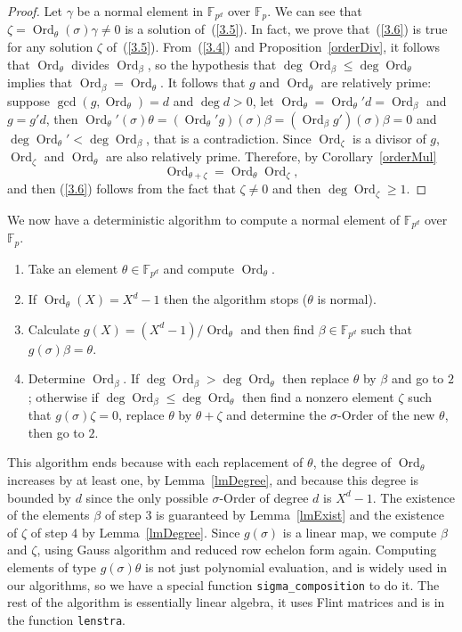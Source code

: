 \documentclass[a4paper,11pt]{article}
\theoremstyle{break}
\theoremstyle{sc}
\theoremstyle{definition}
\theoremstyle{remark}
\DeclareMathOperator{\Ord}{Ord}
\begin{document}
\begin{proof}
  Let $\gamma$ be a normal element in $\mathbb{F}_{p^d}$ over
  $\mathbb{F}_p$. We can see that
  $\zeta=\Ord_\theta(\sigma)\gamma\neq0$ is a solution of~(\ref{3.5}). In
  fact, we prove that~(\ref{3.6}) is true for any solution $\zeta$
  of~(\ref{3.5}). From~(\ref{3.4}) and Proposition~\ref{orderDiv}, it follows
  that $\Ord_\theta$ divides $\Ord_\beta$, so the hypothesis that
  $\deg\Ord_\beta\leq\deg\Ord_\theta$ implies that
  $\Ord_\beta=\Ord_\theta$. It follows that $g$ and $\Ord_\theta$ are relatively
  prime: suppose $\gcd(g, \Ord_\theta)=d$ and $\deg d>0$, let
  $\Ord_\theta=\Ord_\theta'd=\Ord_\beta$ and $g=g'd$, then
  $\Ord_\theta'(\sigma)\theta=(\Ord_\theta'
  g)(\sigma)\beta=(\Ord_\beta g')(\sigma)\beta=0$ and
  $\deg\Ord_\theta'<\deg\Ord_\beta$,
  that is a contradiction. Since $\Ord_\zeta$ is a divisor of $g$,
  $\Ord_\zeta$ and $\Ord_\theta$ are also relatively prime. Therefore,
  by Corollary~\ref{orderMul}
  \[
    \Ord_{\theta+\zeta}=\Ord_\theta\Ord_\zeta,
  \]
  and then (\ref{3.6}) follows from the fact that $\zeta\neq0$ and then
  $\deg\Ord_\zeta\geq1$.
\end{proof}
We now have a deterministic algorithm to compute a normal element of
$\mathbb{F}_{p^d}$ over $\mathbb{F}_p$.
\begin{enumerate}
  \item Take an element $\theta\in\mathbb{F}_{p^d}$ and compute
    $\Ord_\theta$.
  \item If $\Ord_\theta(X)=X^d-1$ then the algorithm stops ($\theta$ is
    normal).
  \item Calculate $g(X)=(X^d-1)/\Ord_\theta$ and then find
    $\beta\in\mathbb{F}_{p^d}$ such that $g(\sigma)\beta=\theta$.
  \item Determine $\Ord_\beta$. If $\deg\Ord_\beta>\deg\Ord_\theta$ then
    replace $\theta$ by $\beta$ and go to $2$; otherwise if
    $\deg\Ord_\beta\leq\deg\Ord_\theta$ then find a nonzero element $\zeta$
    such that $g(\sigma)\zeta=0$, replace $\theta$ by $\theta+\zeta$ and
    determine the $\sigma$-Order of the new $\theta$, then go to $2$.
\end{enumerate}
This algorithm ends because with each replacement of $\theta$, the degree of
$\Ord_\theta$ increases by at least one, by Lemma~\ref{lmDegree}, and because
this degree is bounded by $d$ since the only possible $\sigma$-Order of degree
$d$ is $X^d-1$. The existence of the elements $\beta$ of step $3$ is guaranteed
by Lemma~\ref{lmExist} and the existence of $\zeta$ of step $4$ by
Lemma~\ref{lmDegree}. Since $g(\sigma)$ is a linear map, we compute $\beta$ and
$\zeta$, using Gauss algorithm and reduced row echelon form again. Computing
elements of type $g(\sigma)\theta$ is not just polynomial evaluation,
and is widely used in our algorithms, so we have a special function
\texttt{sigma\_composition} to do it. The rest of the algorithm is
essentially linear algebra, it uses Flint matrices and is in the function
\texttt{lenstra}.
\end{document}
